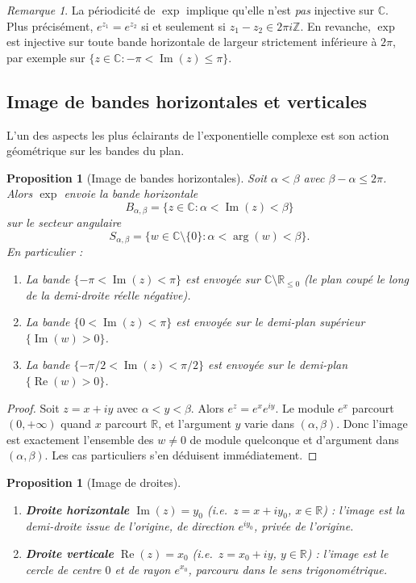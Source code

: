 \documentclass[12pt,a4paper,openany]{book}
\theoremstyle{definition}
\theoremstyle{plain}
\newtheorem{proposition}[definition]{Proposition}
\theoremstyle{remark}
\newtheorem{remarque}[definition]{Remarque}
\newcommand{\C}{\mathbb{C}}
\newcommand{\R}{\mathbb{R}}
\newcommand{\Z}{\mathbb{Z}}
\DeclareMathOperator{\re}{Re}
\DeclareMathOperator{\im}{Im}
\begin{document}
\begin{remarque}\label{rem:exp-non-injective}
La périodicité de $\exp$ implique qu'elle n'est \emph{pas} injective sur $\C$.
Plus précisément, $e^{z_1} = e^{z_2}$ si et seulement si $z_1 - z_2 \in 2\pi i\Z$.
En revanche, $\exp$ est injective sur toute bande horizontale de largeur strictement
inférieure à $2\pi$, par exemple sur
$\{z \in \C : -\pi < \im(z) \leq \pi\}$.
\end{remarque}

\subsection{Image de bandes horizontales et verticales}

L'un des aspects les plus éclairants de l'exponentielle complexe est son action
géométrique sur les bandes du plan.

\begin{proposition}[Image de bandes horizontales]\label{prop:exp-bandes-horizontales}
Soit $\alpha < \beta$ avec $\beta - \alpha \leq 2\pi$. Alors $\exp$ envoie la
bande horizontale
\[
  B_{\alpha,\beta} = \{z \in \C : \alpha < \im(z) < \beta\}
\]
sur le secteur angulaire
\[
  S_{\alpha,\beta} = \{w \in \C \setminus \{0\} : \alpha < \arg(w) < \beta\}.
\]
En particulier :
\begin{enumerate}[label=(\alph*)]
  \item La bande $\{-\pi < \im(z) < \pi\}$ est envoyée sur $\C \setminus \R_{\leq 0}$ (le plan coupé le long de la demi-droite réelle négative).
  \item La bande $\{0 < \im(z) < \pi\}$ est envoyée sur le demi-plan supérieur $\{\im(w) > 0\}$.
  \item La bande $\{-\pi/2 < \im(z) < \pi/2\}$ est envoyée sur le demi-plan $\{\re(w) > 0\}$.
\end{enumerate}
\end{proposition}

\begin{proof}
Soit $z = x + iy$ avec $\alpha < y < \beta$. Alors $e^z = e^x e^{iy}$.
Le module $e^x$ parcourt $(0,+\infty)$ quand $x$ parcourt $\R$, et
l'argument $y$ varie dans $(\alpha,\beta)$. Donc l'image est exactement
l'ensemble des $w \neq 0$ de module quelconque et d'argument dans $(\alpha,\beta)$.
Les cas particuliers s'en déduisent immédiatement.
\end{proof}

\begin{proposition}[Image de droites]\label{prop:exp-droites}
\leavevmode
\begin{enumerate}[label=(\roman*)]
  \item \textbf{Droite horizontale} $\im(z) = y_0$ (i.e.\ $z = x + iy_0$, $x \in \R$) : l'image est la demi-droite issue de l'origine, de direction $e^{iy_0}$, privée de l'origine.
  \item \textbf{Droite verticale} $\re(z) = x_0$ (i.e.\ $z = x_0 + iy$, $y \in \R$) : l'image est le cercle de centre $0$ et de rayon $e^{x_0}$, parcouru dans le sens trigonométrique.
\end{enumerate}
\end{proposition}
\end{document}
